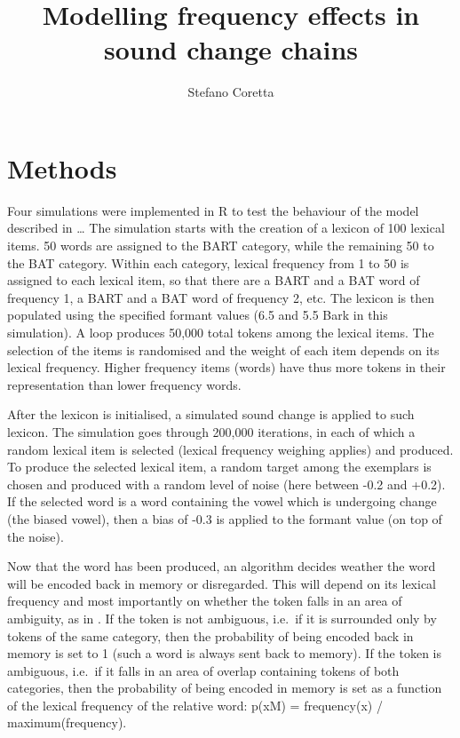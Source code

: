 \documentclass[article, a4paper, 12pt, ]{memoir}
\date{}
\title{Modelling frequency effects in sound change chains}
\author{Stefano Coretta\\\affiliation{The University of Manchester}}
\begin{document}
\setcounter{page}{1}
\maketitle


\section{Methods}\label{methods}

Four simulations were implemented in R \citep{r-core-team2017} to test
the behaviour of the model described in \ldots{} The simulation starts
with the creation of a lexicon of 100 lexical items. 50 words are
assigned to the BART category, while the remaining 50 to the BAT
category. Within each category, lexical frequency from 1 to 50 is
assigned to each lexical item, so that there are a BART and a BAT word
of frequency 1, a BART and a BAT word of frequency 2, etc. The lexicon
is then populated using the specified formant values (6.5 and 5.5 Bark
in this simulation). A loop produces 50,000 total tokens among the
lexical items. The selection of the items is randomised and the weight
of each item depends on its lexical frequency. Higher frequency items
(words) have thus more tokens in their representation than lower
frequency words.

After the lexicon is initialised, a simulated sound change is applied to
such lexicon. The simulation goes through 200,000 iterations, in each of
which a random lexical item is selected (lexical frequency weighing
applies) and produced. To produce the selected lexical item, a random
target among the exemplars is chosen and produced with a random level of
noise (here between -0.2 and +0.2). If the selected word is a word
containing the vowel which is undergoing change (the biased vowel), then
a bias of -0.3 is applied to the formant value (on top of the noise).

Now that the word has been produced, an algorithm decides weather the
word will be encoded back in memory or disregarded. This will depend on
its lexical frequency and most importantly on whether the token falls in
an area of ambiguity, as in \citep{hay2015}. If the token is not
ambiguous, i.e.~if it is surrounded only by tokens of the same category,
then the probability of being encoded back in memory is set to 1 (such a
word is always sent back to memory). If the token is ambiguous, i.e.~if
it falls in an area of overlap containing tokens of both categories,
then the probability of being encoded in memory is set as a function of
the lexical frequency of the relative word: p(x\textbar{}M) =
frequency(x) / maximum(frequency).
\end{document}
